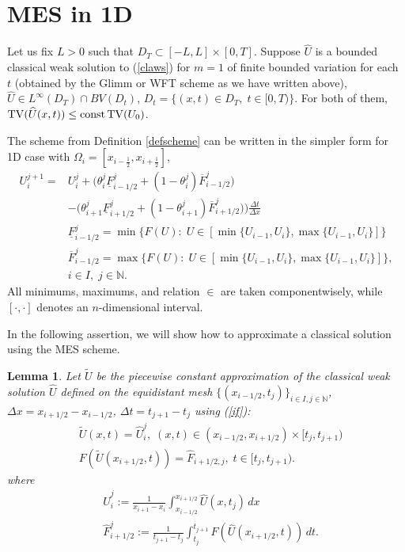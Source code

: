 \documentclass[11pt,a4paper,reqno]{amsart}
\theoremstyle{plain}
\newtheorem{lemma}{Lemma}[section]
\theoremstyle{definition}
\theoremstyle{remark}
\numberwithin{equation}{section}
\begin{document}
{\section{MES in 1D}
Let us fix $L>0$ such that $D_{T}\subset [-L,L]\times [0,T]$. 
Suppose $\widehat{U}$ is a bounded classical weak solution to (\ref{claws}) 
for $m=1$ of finite bounded variation
for each $t$ (obtained by the Glimm or WFT scheme as we have written above), 
$\widehat{U}\in L^{\infty}(D_{T}) \cap BV (D_{t})$, 
$D_{t}=\{(x,t)\in D_{T}, \; t\in [0,T)\}$.
For both of them,  $\mathop{\rm TV}(\widehat{U}(x,t))\leq {\rm const}
\mathop{\rm TV}(U_{0})$. 

The scheme from Definition \ref{defscheme} can be written in the simpler form
for 1D case with $\Omega _{i} = \left[ x _{i - \frac{1}{2}} , x _{i + \frac{1}{2}} \right]$,
\begin{equation} \label{1dscheme}
\begin{split}
U_{i}^{j+1} =  & U_{i}^{j}+\Big( \theta_{i}^{j}\underline{F}_{i-1/2}^{j}
+(1-\theta_{i}^{j})\overline{F}_{i-1/2}^{j}) \\
& -\big(\theta_{i+1}^{j}\underline{F}_{i+1/2}^{j}
+(1-\theta_{i+1}^{j})\overline{F}_{i+1/2}^{j}\big) \Big) \frac{\Delta t}{\Delta x}\\
& \underline{F}_{i-1/2}^{j}=\min\{F(U):\; 
U\in [\min\{U_{i-1},U_{i}\},\max\{U_{i-1},U_{i}\}]\} \\
& \overline{F}_{i-1/2}^{j}=\max\{F(U):\; 
U\in [\min\{U_{i-1},U_{i}\},\max\{U_{i-1},U_{i}\}]\},\\ 
& i\in I,\; j\in \mathbb{N}.
\end{split}
\end{equation}
All minimums, maximums, and relation $\in$ are taken componentwisely, while $[\cdot,\cdot]$
denotes an $n$-dimensional interval.

In the following assertion, we will show how to approximate a classical 
solution using the MES scheme.

\begin{lemma} \label{lemma3.1}
Let $\widetilde{U}$ be the piecewise constant approximation of the classical weak solution
$\widehat{U}$ defined on the equidistant mesh 
$\{ (x_{i-1/2},t_{j})\}_{i\in I, j\in \mathbb{N}}$, $\Delta x=x_{i+1/2}-x_{i-1/2}$, 
$\Delta t=t_{j+1}-t_{j}$ using (\ref{if}):
\[
\begin{split}
& \widetilde{U}(x,t)=\widehat{U}_{i}^{j},\; (x,t) \in (x_{i-1/2},x_{i+1/2})\times [t_{j},t_{j+1}) \\
& F(\widetilde{U}(x_{i+1/2},t))=\widehat{F}_{i+1/2,j},\; t\in [t_{j},t_{j+1}). 
\end{split} 
\]
where 
\begin{equation}\label{kappa} 
\begin{split}
& \widehat{U}_{i}^{j}:= \frac{1}{x_{i+1}-x_{i}}\int_{x_{i-1/2}}^{x_{i+1/2}} \widehat{U}(x,t_{j}) \, dx \\
& \widehat{F}_{i+1/2}^{j}:=\frac{1}{t_{j+1}-t_{j}}\int ^{t_{j+1}}_{t_{j}}F(\widehat{U}(x_{i+1/2},t)) \, dt.
\end{split}
\end{equation}


\end{lemma}}
\end{document}
